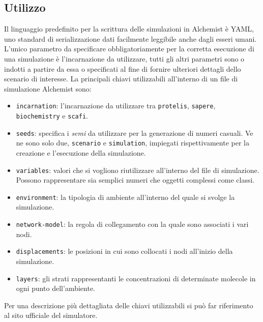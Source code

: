 \subsection{Utilizzo}
Il linguaggio predefinito per la scrittura delle simulazioni in Alchemist è YAML, uno standard di serializzazione dati facilmente leggibile anche dagli esseri umani. \newline
L'unico parametro da specificare obbligatoriamente per la corretta esecuzione di una simulazione è l'incarnazione da utilizzare, tutti gli altri parametri sono o indotti a partire da essa o specificati al fine di fornire ulteriori dettagli dello scenario di interesse. \newline
La principali chiavi utilizzabili all'interno di un file di simulazione Alchemist sono:
\begin{itemize}
    \item \texttt{incarnation}: l'incarnazione da utilizzare tra \texttt{protelis}, \texttt{sapere}, \texttt{biochemistry} e \texttt{scafi}.
    \item \texttt{seeds}: specifica i \textit{semi} da utilizzare per la generazione di numeri casuali. Ve ne sono solo due, \texttt{scenario} e \texttt{simulation}, impiegati rispettivamente per la creazione e l'esecuzione della simulazione.
    \item \texttt{variables}: valori che si vogliono riutilizzare all'interno del file di simulazione. Possono rappresentare sia semplici numeri che oggetti complessi come classi.
    \item \texttt{environment}: la tipologia di ambiente all'interno del quale si svolge la simulazione.
    \item \texttt{network-model}: la regola di collegamento con la quale sono associati i vari nodi.
    \item \texttt{displacements}: le posizioni in cui sono collocati i nodi all'inizio della simulazione.
    \item \texttt{layers}: gli strati rappresentanti le concentrazioni di determinate molecole in ogni punto dell'ambiente.
\end{itemize}
Per una descrizione più dettagliata delle chiavi utilizzabili si può far riferimento al sito ufficiale del simulatore.

